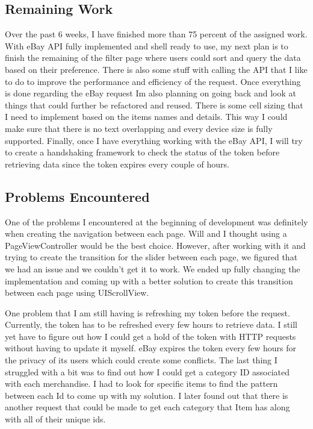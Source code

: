 \documentclass[onecolumn, draftclsnofoot,10pt, compsoc]{IEEEtran}
\begin{document}
\subsection{Remaining Work}
\par Over the past 6 weeks, I have finished more than 75 percent of the assigned work. With eBay API fully implemented and shell ready to use, my next plan is to finish the remaining of the filter page where users could sort and query the data based on their preference. There is also some stuff with calling the API that I like to do to improve the performance and efficiency of the request. Once everything is done regarding the eBay request Im also planning on going back and look at things that could further be refactored and reused.  There is some cell sizing that I need to implement based on the items names and details. This way I could make sure that there is no text overlapping and every device size is fully supported. Finally, once I have everything working with the eBay API, I will try to create a handshaking framework to check the status of the token before retrieving data since the token expires every couple of hours. 

\subsection{Problems Encountered}
\par One of the problems I encountered at the beginning of development was definitely when creating the navigation between each page. Will and I thought using a PageViewController would be the best choice. However, after working with it and trying to create the transition for the slider between each page, we figured that we had an issue and we couldn’t get it to work. We ended up fully changing the implementation and coming up with a better solution to create this transition between each page using UIScrollView. 

\par One problem that I am still having is refreshing my token before the request. Currently, the token has to be refreshed every few hours to retrieve data. I still yet have to figure out how I could get a hold of the token with HTTP requests without having to update it myself. eBay expires the token every few hours for the privacy of its users which could create some conflicts. The last thing I struggled with a bit was to find out how I could get a category ID associated with each merchandise. I had to look for specific items to find the pattern between each Id to come up with my solution. I later found out that there is another request that could be made to get each category that Item has along with all of their unique ids. 
\end{document}
